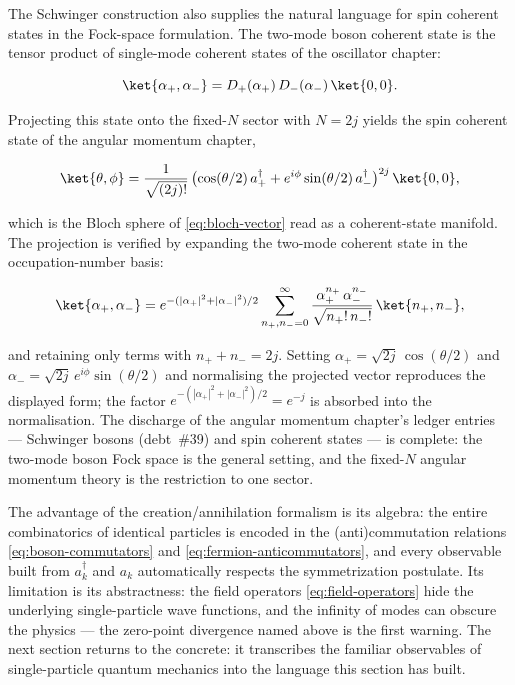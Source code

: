 The Schwinger construction also supplies the natural language for spin coherent states in the Fock-space formulation. The two-mode boson coherent state is the tensor product of single-mode coherent states of the oscillator chapter:
\begin{linenomath}
    \begin{equation*}
        \ket{\alpha_+, \alpha_-} = D_+(\alpha_+)\,D_-(\alpha_-)\,\ket{0,0}.
    \end{equation*}
\end{linenomath}
Projecting this state onto the fixed-$N$ sector with $N = 2j$ yields the spin coherent state of the angular momentum chapter,
\begin{linenomath}
    \begin{equation*}
        \ket{\theta, \phi}
        = \frac{1}{\sqrt{(2j)!}}\,
          \bigl(\cos(\theta/2)\,a_+^\dagger + e^{i\phi}\sin(\theta/2)\,a_-^\dagger\bigr)^{2j}\,\ket{0,0},
    \end{equation*}
\end{linenomath}
which is the Bloch sphere of \eqref{eq:bloch-vector} read as a coherent-state manifold. The projection is verified by expanding the two-mode coherent state in the occupation-number basis:
\begin{linenomath}
    \begin{equation*}
        \ket{\alpha_+, \alpha_-}
        = e^{-(|\alpha_+|^2 + |\alpha_-|^2)/2}
          \sum_{n_+, n_- = 0}^\infty
          \frac{\alpha_+^{n_+}\,\alpha_-^{n_-}}{\sqrt{n_+!\,n_-!}}\,
          \ket{n_+, n_-},
    \end{equation*}
\end{linenomath}
and retaining only terms with $n_+ + n_- = 2j$. Setting $\alpha_+ = \sqrt{2j}\,\cos(\theta/2)$ and $\alpha_- = \sqrt{2j}\,e^{i\phi}\sin(\theta/2)$ and normalising the projected vector reproduces the displayed form; the factor $e^{-(|\alpha_+|^2+|\alpha_-|^2)/2} = e^{-j}$ is absorbed into the normalisation. The discharge of the angular momentum chapter's ledger entries --- Schwinger bosons (debt~\#39) and spin coherent states --- is complete: the two-mode boson Fock space is the general setting, and the fixed-$N$ angular momentum theory is the restriction to one sector.

The advantage of the creation/annihilation formalism is its algebra: the entire combinatorics of identical particles is encoded in the (anti)commutation relations \eqref{eq:boson-commutators} and \eqref{eq:fermion-anticommutators}, and every observable built from $a_k^\dagger$ and $a_k$ automatically respects the symmetrization postulate. Its limitation is its abstractness: the field operators \eqref{eq:field-operators} hide the underlying single-particle wave functions, and the infinity of modes can obscure the physics --- the zero-point divergence named above is the first warning. The next section returns to the concrete: it transcribes the familiar observables of single-particle quantum mechanics into the language this section has built.

